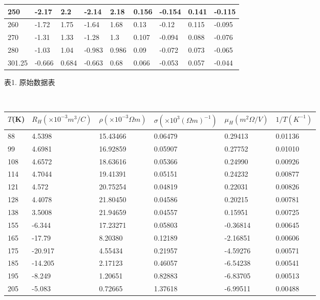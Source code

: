 \documentclass[UTF8]{ctexart}
\begin{document}
\begin{table}[!ht]
\begin{tabular}{|l|l|l|l|l|l|l|l|l|}
        250 & -2.17 & 2.2 & -2.14 & 2.18 & 0.156 & -0.154 & 0.141 & -0.115 \\ \hline
        260 & -1.72 & 1.75 & -1.64 & 1.68 & 0.13 & -0.12 & 0.115 & -0.095 \\ \hline
        270 & -1.31 & 1.33 & -1.28 & 1.3 & 0.107 & -0.094 & 0.088 & -0.076 \\ \hline
        280 & -1.03 & 1.04 & -0.983 & 0.986 & 0.09 & -0.072 & 0.073 & -0.065 \\ \hline
        301.25 & -0.666 & 0.684 & -0.663 & 0.68 & 0.066 & -0.053 & 0.057 & -0.044 \\ \hline
    \end{tabular}
    表1. 原始数据表
\end{table}\\
\begin{table}[!ht]
    \centering
    \begin{tabular}{|l|l|l|l|l|l|}
    \hline
        $T$(K) & $R_H(\times10^{-3}m^3/C)$& $\rho(\times10^{-3}\Omega m)$ & $\sigma(\times 10^3(\Omega m)^{-1})$ & $\mu_H(m^2\Omega/V)$ & $1/T(K^{-1})$ \\ \hline
        88 & 4.5398 & 15.43466 & 0.06479 & 0.29413 & 0.01136 \\ \hline
        99 & 4.6981 & 16.92859 & 0.05907 & 0.27752 & 0.01010 \\ \hline
        108 & 4.6572 & 18.63616 & 0.05366 & 0.24990 & 0.00926 \\ \hline
        114 & 4.7044 & 19.41391 & 0.05151 & 0.24232 & 0.00877 \\ \hline
        121 & 4.572 & 20.75254 & 0.04819 & 0.22031 & 0.00826 \\ \hline
        128 & 4.4078 & 21.80450 & 0.04586 & 0.20215 & 0.00781 \\ \hline
        138 & 3.5008 & 21.94659 & 0.04557 & 0.15951 & 0.00725 \\ \hline
        155 & -6.344 & 17.23271 & 0.05803 & -0.36814 & 0.00645 \\ \hline
        165 & -17.79 & 8.20380 & 0.12189 & -2.16851 & 0.00606 \\ \hline
        175 & -20.917 & 4.55434 & 0.21957 & -4.59276 & 0.00571 \\ \hline
        185 & -14.205 & 2.17123 & 0.46057 & -6.54238 & 0.00541 \\ \hline
        195 & -8.249 & 1.20651 & 0.82883 & -6.83705 & 0.00513 \\ \hline
        205 & -5.083 & 0.72665 & 1.37618 & -6.99511 & 0.00488 \\ \hline

\end{tabular}
\end{table}
\end{document}
